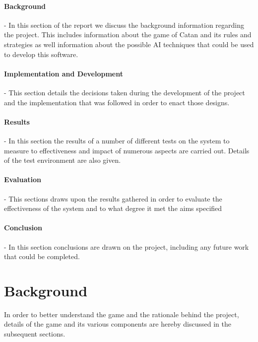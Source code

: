 \documentclass[]{article}
\let\oldsection\section
\renewcommand\section{\clearpage\oldsection}
\begin{document}
\paragraph{\large Background}-
\vspace{0.2cm}
\newline In this section of the report we discuss the background information regarding the project. This includes information about the game of Catan and its rules and strategies as well information about the possible AI techniques that could be used to develop this software.

\paragraph{\large Implementation and Development}-
\vspace{0.2cm}
\newline This section details the decisions taken during the development of the project and the implementation that was followed in order to enact those designs.

\paragraph{\large Results}-
\vspace{0.2cm}
\newline In this section the results of a number of different tests on the system to measure to effectiveness and impact of numerous aspects are carried out. Details of the test environment are also given. 

\paragraph{\large Evaluation}-
\vspace{0.2cm}
\newline This sections draws upon the results gathered in order to evaluate the effectiveness of the system and to what degree it met the aims specified

\paragraph{\large Conclusion}-
\vspace{0.2cm}
\newline In this section conclusions are drawn on the project, including any future work that could be completed.

\section{Background}
In order to better understand the game and the rationale behind the project, details of the game and its various components are hereby discussed in the subsequent sections. 
\end{document}
